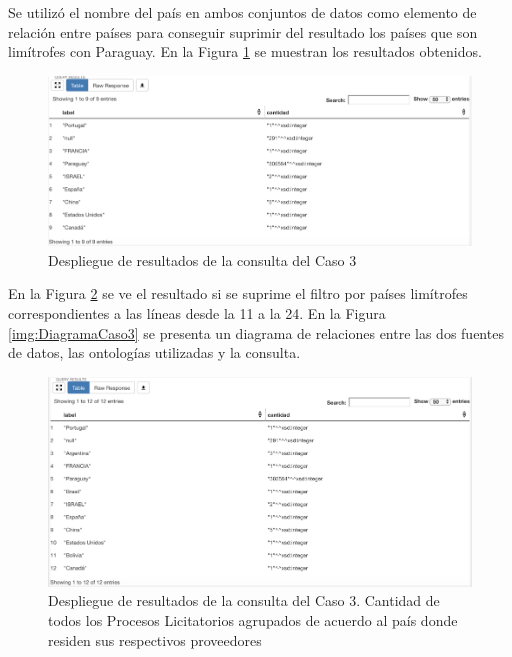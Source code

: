 Se utilizó el nombre del país en ambos conjuntos de datos como elemento de relación entre países para conseguir suprimir del resultado los países que son limítrofes con Paraguay. En la Figura \ref{img:caso3Resultado1} se muestran los resultados obtenidos.


\begin{figure}[ht!]
    \centering
    \includegraphics[width=150mm]{figuras/caso3Resultado1.png}
    \caption{Despliegue de resultados de la consulta del Caso 3}
    \label{img:caso3Resultado1}
 \end{figure}


En la Figura \ref{img:caso3Resultado2} se ve el resultado si se suprime el filtro por países limítrofes correspondientes a las líneas desde la 11 a la 24. En la Figura \ref{img:DiagramaCaso3} se presenta un diagrama de relaciones entre las dos fuentes de datos, las ontologías utilizadas y la consulta.


 \begin{figure}[ht!]
    \centering
    \includegraphics[width=150mm]{figuras/caso3Resultado2.png}
    \caption{Despliegue de resultados de la consulta del Caso 3. Cantidad de todos los Procesos Licitatorios agrupados de acuerdo al país donde residen sus respectivos proveedores}
    \label{img:caso3Resultado2}
 \end{figure}


